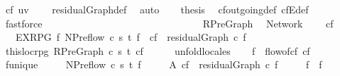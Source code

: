 \begin{isabellebody}
\ {\isachardoublequoteopen}cf\ {\isacharparenleft}u{\isacharcomma}v{\isacharparenright}\ {\isachargreater}\ {}{\isachardoublequoteclose}\ \isamarkupfalse%
\ residualGraph{\isacharunderscore}def\ \isamarkupfalse%
\ auto\isanewline
\ \ \isamarkupfalse%
\ {\isacharquery}thesis\ \isamarkupfalse%
\ cf{\isachardot}outgoing{\isacharunderscore}def\ cf{\isachardot}E{\isacharunderscore}def\ \isamarkupfalse%
\ fastforce\ \ \ \isanewline
{}\isamarkupfalse%
%
\endisatagproof
{\isafoldproof}%
%
\isadelimproof
\ \ \ \ \ \ \isanewline
%
\endisadelimproof
\ \ \ \ \isanewline
\ \ \ \ \isanewline
\ \ \ \ \isanewline
{}\isamarkupfalse%
\ %
\isanewline
\ \ \isanewline
\ \ \isanewline
{}\isamarkupfalse%
\ RPreGraph\ %
\isanewline
{\isacharequal}\ Network\ {\isacharplus}\isanewline
\ \ \ cf\isanewline
\ \ \ EX{\isacharunderscore}RPG{\isacharcolon}\ {\isachardoublequoteopen}{\isasymexists}f{\isachardot}\ NPreflow\ c\ s\ t\ f\ {\isasymand}\ cf\ {\isacharequal}\ residualGraph\ c\ f{\isachardoublequoteclose}\isanewline
{}\ \ \isanewline
\isanewline
\ \ \isamarkupfalse%
\ this{\isacharunderscore}loc{\isacharunderscore}rpg{\isacharcolon}\ {\isachardoublequoteopen}RPreGraph\ c\ s\ t\ cf{\isachardoublequoteclose}\isanewline
%
\isadelimproof
\ \ \ \ %
\endisadelimproof
%
\isatagproof
{}\isamarkupfalse%
\ unfold{\isacharunderscore}locales%
\endisatagproof
{\isafoldproof}%
%
\isadelimproof
\isanewline
%
\endisadelimproof
\isanewline
\ \ \isamarkupfalse%
\ {\isachardoublequoteopen}f\ {\isasymequiv}\ flow{\isacharunderscore}of{\isacharunderscore}cf\ cf{\isachardoublequoteclose}\isanewline
\isanewline
\ \ \isamarkupfalse%
\ f{\isacharunderscore}unique{\isacharcolon}\isanewline
\ \ \ \ \ {\isachardoublequoteopen}NPreflow\ c\ s\ t\ f{\isacharprime}{\isachardoublequoteclose}\isanewline
\ \ \ \ \ A{\isacharcolon}\ {\isachardoublequoteopen}cf\ {\isacharequal}\ residualGraph\ c\ f{\isacharprime}{\isachardoublequoteclose}\isanewline
\ \ \ \ \ {\isachardoublequoteopen}f{\isacharprime}\ {\isacharequal}\ f{\isachardoublequoteclose}\isanewline
%
\isadelimproof
\ \ %
\endisadelimproof
%
\isatagproof
{}\isamarkupfalse%
\ {\isacharminus}\isanewline
\ \ \ \ \isamarkupfalse%

\end{isabellebody}

